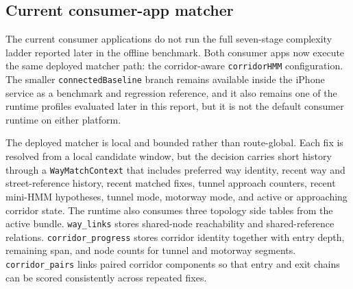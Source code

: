 \documentclass{article}
\begin{document}
\subsection{Current consumer-app matcher}
The current consumer applications do not run the full seven-stage complexity ladder reported later in the offline benchmark. Both consumer apps now execute the same deployed matcher path: the corridor-aware \texttt{corridorHMM} configuration. The smaller \texttt{connectedBaseline} branch remains available inside the iPhone service as a benchmark and regression reference, and it also remains one of the runtime profiles evaluated later in this report, but it is not the default consumer runtime on either platform.

The deployed matcher is local and bounded rather than route-global. Each fix is resolved from a local candidate window, but the decision carries short history through a \texttt{WayMatchContext} that includes preferred way identity, recent way and street-reference history, recent matched fixes, tunnel approach counters, recent mini-HMM hypotheses, tunnel mode, motorway mode, and active or approaching corridor state. The runtime also consumes three topology side tables from the active bundle. \texttt{way\_links} stores shared-node reachability and shared-reference relations. \texttt{corridor\_progress} stores corridor identity together with entry depth, remaining span, and node counts for tunnel and motorway segments. \texttt{corridor\_pairs} links paired corridor components so that entry and exit chains can be scored consistently across repeated fixes.
\end{document}
